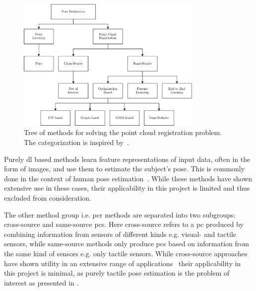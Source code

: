\begin{figure}[h]
	\begin{small}
		\begin{center}
			\includegraphics[width=0.8\textwidth]{chapters/state-of-the-art/fig/pe-categories-v3.pdf}
		\end{center}
		\caption{Tree of methods for solving the point cloud registration problem. The categorization is inspired by~\cite{a-comprehensive-survey-on-point-cloud-registration}.}
		\label{fig:pe-categories}
	\end{small}
\end{figure}

Purely \gls{dl} based methods learn feature representations of input data, often in the form of images, and use them to estimate the subject's pose. This is commonly done in the context of human pose estimation~\cite{hands-deep-in-deep-learning-for-hand-pose-estimation, deeppose:-human-pose-estimation-via-deep-neural-networks, deeplabcut:-markerless-pose-estimation-of-user-defined-body-parts-with-deep-learning}. While these methods have shown extensive use in these cases, their applicability in this project is limited and thus excluded from consideration. \medskip

The other method group i.e. \gls{pcr} methods are separated into two subgroups: cross-source and same-source \gls{pc}s. Here cross-source refers to a \gls{pc} produced by combining information from sensors of different kinds e.g. visual- and tactile sensors, while same-source methods only produce \gls{pc}s based on information from the same kind of sensors e.g. only tactile sensors. 
While cross-source approaches have shown utility in an extensive range of applications~\cite{a-systematic-approach-for-cross-source-point-cloud-registration-by-preserving-macro-and-micro-structures,a-coarse-to-fine-algorithm-for-matching-and-registration-in-3d-cross-source-point-clouds,a-comprehensive-survey-on-point-cloud-registration} their applicability in this project is minimal, as purely tactile pose estimation is the problem of interest as presented in . \medskip

